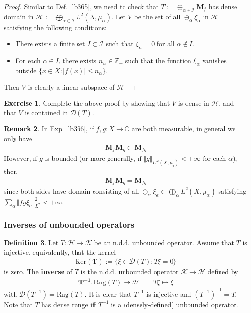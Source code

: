 \documentclass[12pt,b5paper,notitlepage]{article}
\theoremstyle{definition}
\newtheorem{df}{Definition}[subsection]
\newtheorem{exe}[df]{Exercise}
\newtheorem{rem}[df]{Remark}
\theoremstyle{plain}
\newcommand{\Dom}{\mathscr{D}}
\newcommand{\Cbb}{\mathbb C}
\newcommand{\Zbb}{\mathbb Z}
\newcommand{\Ker}{\mathrm{Ker}}
\newcommand{\Rng}{\mathrm{Rng}}
\newcommand{\MH}{\mathcal H}
\newcommand{\MK}{\mathcal K}
\newcommand{\SI}{\mathscr I}
\newcommand{\Mbf}{\mathbf M}
\numberwithin{equation}{section}
\begin{document}
\begin{proof}
Similar to Def. \ref{lb365}, we need to check that $T:=\oplus_{\alpha\in\SI}\Mbf_f$ has dense domain in $\MH:=\bigoplus_{\alpha\in\SI}L^2(X,\mu_\alpha)$. Let $V$ be the set of all $\oplus_\alpha\xi_\alpha$ in $\MH$ satisfying the following conditions:
\begin{itemize}
\item There exists a finite set $I\subset\SI$ such that $\xi_\alpha=0$ for all $\alpha\notin I$.
\item For each $\alpha\in I$, there exists $n_\alpha\in\Zbb_+$ such that the function $\xi_\alpha$ vanishes outside $\{x\in X:|f(x)|\leq n_\alpha\}$.
\end{itemize}
Then $V$ is clearly a linear subspace of $\MH$.
\end{proof}

\begin{exe}
Complete the above proof by showing that $V$ is dense in $\MH$, and that $V$ is contained in $\Dom(T)$.
\end{exe}





\begin{rem}\label{lb371}
In Exp. \ref{lb366}, if $f,g:X\rightarrow\Cbb$ are both measurable, in general we only have
\begin{align*}
\Mbf_f\Mbf_g\subset\Mbf_{fg}
\end{align*}
However, if $g$ is bounded (or more generally, if $\Vert g\Vert_{L^\infty(X,\mu_\alpha)}<+\infty$ for each $\alpha$), then
\begin{align*}
\Mbf_f\Mbf_g=\Mbf_{fg}
\end{align*}
since both sides have domain consisting of all $\oplus_\alpha\xi_\alpha\in\bigoplus_\alpha L^2(X,\mu_\alpha)$ satisfying $\sum_\alpha\Vert fg\xi_\alpha\Vert_{L^2}^2<+\infty$.
\end{rem}



\subsubsection{Inverses of unbounded operators}


\begin{df}\label{lb377}
Let $T:\MH\rightarrow\MK$ be an n.d.d. unbounded operator. Assume that $T$ is injective, equivalently, that the kernel 
\begin{align*}
\pmb{\Ker(T)}:=\{\xi\in\Dom(T):T\xi=0\}
\end{align*}
is zero. The \textbf{inverse}  of $T$ is the n.d.d. unbounded operator $\MK\rightarrow\MH$ defined by
\begin{gather*}
\pmb{T^{-1}}:\Rng(T)\rightarrow\MH\qquad T\xi\mapsto \xi
\end{gather*}
with $\Dom(T^{-1})=\Rng(T)$. It is clear that $T^{-1}$ is injective and $(T^{-1})^{-1}=T$. Note that $T$ has dense range iff $T^{-1}$ is a (densely-defined) unbounded operator.
\end{df}
\end{document}
